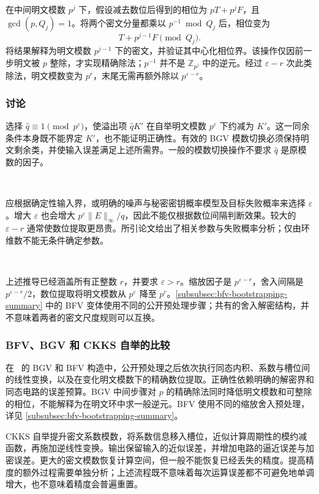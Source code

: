  在中间明文模数 $p^j$ 下，假设减去数位后得到的相位为 $pT+p^jF$，且 $\gcd(p,Q_j)=1$。将两个密文分量都乘以 $p^{-1}\bmod Q_j$ 后，相位变为
\[
T+p^{j-1}F\pmod{Q_j}.
\]
将结果解释为明文模数 $p^{j-1}$ 下的密文，并验证其中心化相位界。该操作仅因前一步明文被 $p$ 整除，才实现精确除法；$p^{-1}$ 并不是 $\mathbb Z_{p^j}$ 中的逆元。经过 $\varepsilon-r$ 次此类除法，明文模数变为 $p^r$，末尾无需再额外除以 $p^{\varepsilon-r}$。

\subsubsection{讨论}

 选择 $\hat q\equiv1\pmod{p^\varepsilon}$，使溢出项 $\hat qK'$ 在自举明文模数 $p^\varepsilon$ 下约减为 $K'$。这一同余条件本身既不能界定 $K'$，也不能证明正确性。有效的 BGV 模数切换必须保持明文剩余类，并使输入误差满足上述所需界。一般的模数切换操作不要求 $\hat q$ 是原模数的因子。

$ $

 应根据确定性输入界，或明确的噪声与秘密密钥概率模型及目标失败概率来选择 $\varepsilon$。增大 $\varepsilon$ 也会增大 $p^\varepsilon\|E\|_\infty/q$，因此不能仅根据数位间隔判断效果。较大的 $\varepsilon-r$ 通常使数位提取更昂贵。所引论文给出了相关参数与失败概率分析；仅由环维数不能无条件确定参数。

$ $

 上述推导已经涵盖所有正整数 $r$，并要求 $\varepsilon>r$。缩放因子是 $p^{\varepsilon-r}$，舍入间隔是 $p^{\varepsilon-r}/2$，数位提取将明文模数从 $p^\varepsilon$ 降至 $p^r$。\autoref{subsubsec:bfv-bootstrapping-summary} 中的 BFV 变体使用不同的公开预处理步骤；共有的舍入解密结构，并不意味着两者的密文尺度规则可以互换。







\subsubsection{BFV、BGV 和 CKKS 自举的比较}
\label{subsubsec:bootstrapping-differences}

在~\cite{cryptoeprint:2022/1363} 的 BGV 和 BFV 构造中，公开预处理之后依次执行同态内积、系数与槽位间的线性变换，以及在变化明文模数下的精确数位提取。正确性依赖明确的解密界和同态电路的误差预算。BGV 中间步骤对 $p$ 的精确除法同时降低明文模数和可整除的相位，不能解释为在明文环中求一般逆元。BFV 使用不同的缩放舍入预处理，详见 \autoref{subsubsec:bfv-bootstrapping-summary}。

CKKS 自举提升密文系数模数，将系数信息移入槽位，近似计算周期性的模约减函数，再施加逆线性变换。输出保留输入的近似误差，并增加电路的逼近误差与加密误差。更大的密文模数恢复计算空间，但一般不能恢复已经丢失的精度。提高精度的额外过程需要单独分析；上述流程既不意味着每次运算误差都不可避免地单调增大，也不意味着精度会普遍重置。
